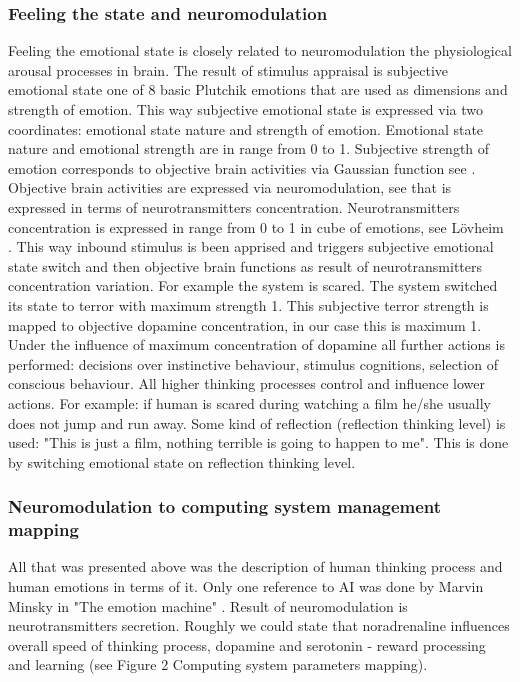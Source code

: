 \subsubsection{Feeling the state and neuromodulation}

Feeling the emotional state is closely related to neuromodulation the physiological arousal processes in brain. The result of stimulus appraisal is subjective emotional state one of 8 basic Plutchik emotions that are used as dimensions and strength of emotion. This way subjective emotional state is expressed via two coordinates: emotional state nature and strength of emotion. Emotional state nature and emotional strength are in range from 0 to 1. Subjective strength of emotion corresponds to objective brain activities via Gaussian function see \cite{hourglass}. Objective brain activities are expressed via neuromodulation, see \cite{emotionsbraintorobot} that is expressed in terms of neurotransmitters concentration. Neurotransmitters  concentration is expressed in range from 0 to 1 in cube of emotions, see L\"{o}vheim \cite{cubeofemotions}. This way inbound stimulus is been apprised and triggers subjective emotional state switch and then objective brain functions as result of neurotransmitters concentration variation. For example the system is scared. The system switched its state to terror with maximum strength 1. This subjective terror strength is mapped to objective dopamine concentration, in our case this is maximum 1. Under the influence of maximum concentration of dopamine all further actions is performed: decisions over instinctive behaviour, stimulus cognitions, selection of conscious behaviour. All higher thinking processes control and influence lower actions. For example: if human is scared during watching a film he/she usually does not jump and run away. Some kind of reflection (reflection thinking level) is used: "This is just a film, nothing terrible is going to happen to me". This is done by switching emotional state on reflection thinking level.

\subsubsection{Neuromodulation to computing system management mapping}

All that was presented above was the description of human thinking process and human emotions in terms of it. Only one reference to AI was done by Marvin Minsky in "The emotion machine" \cite{emotionmachine}. Result of neuromodulation is neurotransmitters secretion. Roughly we could state that noradrenaline influences overall speed of thinking process, dopamine and serotonin - reward processing and learning (see Figure 2 Computing system parameters mapping).

